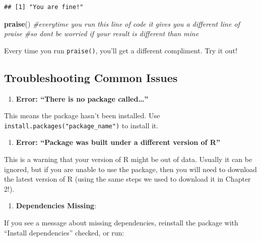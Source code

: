 \documentclass[
]{book}
\newenvironment{Shaded}{\begin{snugshade}}{\end{snugshade}}
\newcommand{\CommentTok}[1]{\textcolor[rgb]{0.56,0.35,0.01}{\textit{#1}}}
\newcommand{\FunctionTok}[1]{\textcolor[rgb]{0.13,0.29,0.53}{\textbf{#1}}}
\newcommand{\NormalTok}[1]{#1}
\providecommand{\tightlist}{%
  \setlength{\itemsep}{0pt}\setlength{\parskip}{0pt}}
\begin{document}
\begin{verbatim}
## [1] "You are fine!"
\end{verbatim}

\begin{Shaded}
\begin{Highlighting}[]
\FunctionTok{praise}\NormalTok{() }\CommentTok{\#everytime you run this line of code it gives you a different line of praise}
\CommentTok{\#so don\textquotesingle{}t be worried if your result is different than mine}
\end{Highlighting}
\end{Shaded}

Every time you run \texttt{praise()}, you'll get a different compliment. Try it out!

\subsection{Troubleshooting Common Issues}\label{troubleshooting-common-issues}

\begin{enumerate}
\def\labelenumi{\arabic{enumi}.}
\tightlist
\item
  \textbf{Error: ``There is no package called\ldots{}''}
\end{enumerate}

This means the package hasn't been installed. Use \texttt{install.packages("package\_name")} to install it.

\begin{enumerate}
\def\labelenumi{\arabic{enumi}.}
\setcounter{enumi}{1}
\tightlist
\item
  \textbf{Error: ``Package was built under a different version of R''}
\end{enumerate}

This is a warning that your version of R might be out of data. Usually it can be ignored, but if you are unable to use the package, then you will need to download the latest version of R (using the same steps we used to download it in Chapter 2!).

\begin{enumerate}
\def\labelenumi{\arabic{enumi}.}
\setcounter{enumi}{2}
\tightlist
\item
  \textbf{Dependencies Missing}:
\end{enumerate}

If you see a message about missing dependencies, reinstall the package with ``Install dependencies'' checked, or run:
\end{document}
